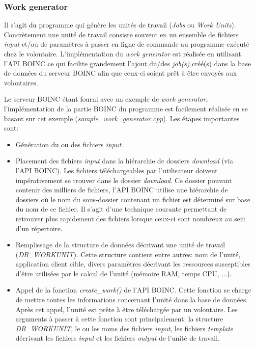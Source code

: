 \documentclass[a4paper, 11pt]{article}
\begin{document}
\subsubsection{Work generator}
Il s'agit du programme qui génère les unités de travail (\textit{Jobs} ou \textit{Work Units}). Concrètement une unité de travail consiste souvent en un ensemble de fichiers \textit{input} et/ou de paramètres à passer en ligne de commande au programme exécuté chez le volontaire. L'implémentation du \textit{work generator} est réalisée en utilisant l'API \textsc{BOINC} ce qui facilite grandement l'ajout du/des \textit{job(s)} créé(s) dans la base de données du serveur \textsc{BOINC} afin que ceux-ci soient prêt à être envoyés aux volontaires.

Le serveur \textsc{BOINC} étant fourni avec un exemple de \textit{work generator}, l'implémentation de la partie \textsc{BOINC} du programme est facilement réalisée en se basant sur cet exemple (\textit{sample\_work\_generator.cpp}). Les étapes importantes sont:
\begin{itemize}
\item Génération du ou des fichiers \textit{input}.
\item Placement des fichiers \textit{input} dans la hiérarchie de dossiers \textit{download} (via l'API \textsc{BOINC}). Les fichiers téléchargeables par l'utilisateur doivent impérativement se trouver dans le dossier \textit{download}. Ce dossier pouvant contenir des milliers de fichiers, l'API \textsc{BOINC} utilise une hiérarchie de dossiers où le nom du sous-dossier contenant un fichier est déterminé sur base du nom de ce fichier. Il s'agit d'une technique courante permettant de retrouver plus rapidement des fichiers lorsque ceux-ci sont nombreux au sein d'un répertoire.
\item Remplissage de la structure de données décrivant une unité de travail (\textit{DB\_WORKUNIT}). Cette structure contient entre autres: nom de l'unité, application client cible, divers paramètres décrivant les ressources susceptibles d'être utilisées par le calcul de l'unité (mémoire RAM, temps CPU, ...).
\item Appel de la fonction \textit{create\_work()} de l'API \textsc{BOINC}. Cette fonction se charge de mettre toutes les informations concernant l'unité dans la base de données. Après cet appel, l'unité est prête à être téléchargée par un volontaire. Les arguments à passer à cette fonction sont principalement: la structure \textit{DB\_WORKUNIT}, le ou les noms des fichiers \textit{input}, les fichiers \textit{template} décrivant les fichiers \textit{input} et les fichiers \textit{output} de l'unité de travail. %
\end{itemize}
\end{document}
